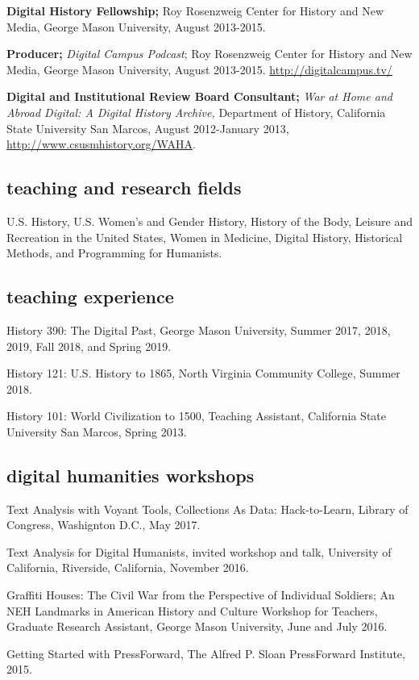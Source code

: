 \documentclass[11pt]{article}
\begin{document}
\textbf{Digital History Fellowship;} Roy Rosenzweig Center for History and New Media, George Mason University, August 2013-2015.

\textbf{Producer;} \emph{Digital Campus Podcast}; Roy Rosenzweig Center for History and New Media, George Mason University, August 2013-2015. \url{http://digitalcampus.tv/}

\textbf{Digital and Institutional Review Board Consultant;} \emph{War at Home and Abroad Digital: A Digital History Archive,} Department of History, California State University San Marcos, August 2012-January 2013, \url{http://www.csusmhistory.org/WAHA}.

\subsection{teaching and research fields}
U.S. History, U.S. Women's and Gender History, History of the Body, Leisure and Recreation in the United States, Women in Medicine, Digital History, Historical Methods, and Programming for Humanists.

\subsection{teaching experience}
History 390: The Digital Past, George Mason University, Summer 2017, 2018, 2019, Fall 2018, and Spring 2019.

History 121: U.S. History to 1865, North Virginia Community College, Summer 2018.

History 101: World Civilization to 1500, Teaching Assistant, California State University San Marcos, Spring 2013.

\subsection{digital humanities workshops}
Text Analysis with Voyant Tools, Collections As Data: Hack-to-Learn, Library of Congress, Washignton D.C., May 2017.

Text Analysis for Digital Humanists, invited workshop and talk, University of California, Riverside, California, November 2016.

Graffiti Houses: The Civil War from the Perspective of Individual Soldiers; An NEH Landmarks in American History and Culture Workshop for Teachers, Graduate Research Assistant, George Mason University, June and July 2016.

Getting Started with PressForward, The Alfred P. Sloan PressForward Institute, 2015.
\end{document}
